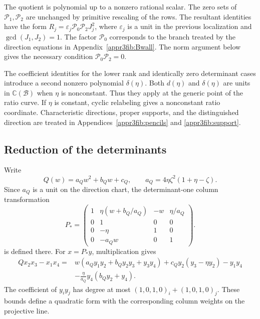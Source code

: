 \documentclass[11pt,a4paper]{article}
\numberwithin{equation}{section}
\theoremstyle{plain}
\theoremstyle{definition}
\theoremstyle{remark}
\begin{document}
The quotient is polynomial up to a nonzero rational scalar. The
zero sets of $\mathcal P_1,\mathcal P_2$ are unchanged by primitive rescaling of the rows.
The resultant identities have the form $R_j=\varepsilon_j\mathcal P_0\mathcal P_2J_j^2$, where
$\varepsilon_j$ is a unit in the previous localization and $\gcd(J_1,J_2)=1$.
The factor $\mathcal P_0$ corresponds to the branch treated by the
direction equations in Appendix~\ref{appr3fib:Bwall}.
The norm argument below gives the necessary condition $\mathcal P_0\mathcal P_2=0$.

The coefficient identities for the lower rank and identically zero
determinant cases introduce a second nonzero polynomial $\delta(\eta)$.
Both $d(\eta)$ and $\delta(\eta)$ are units in
$\mathbb C(\mathscr B)$ when $\eta$ is nonconstant.
Thus they apply at the generic point of the ratio curve.
If $\eta$ is constant, cyclic relabeling gives a nonconstant ratio
coordinate. Characteristic directions, proper supports, and the
distinguished direction are treated in
Appendices~\ref{appr3fib:pencils} and \ref{appr3fib:support}.

\subsection{Reduction of the determinants}
\label{appr3:determinantreduction}

Write
\begin{equation}\label{r3:Qcoefficients}
Q(w)=a_Qw^2+b_Qw+c_Q,\qquad
a_Q=4\eta \zeta ^2(1+\eta -\zeta ).
\end{equation}
Since $a_Q$ is a unit on the direction chart, the determinant-one
column transformation
\begin{equation}\label{r3:columntransform}
P_*=
\begin{pmatrix}
1&\eta (w+b_Q/a_Q)&-w&\eta /a_Q\\
0&1&0&0\\
0&-\eta &1&0\\
0&-a_Qw&0&1
\end{pmatrix}.
\end{equation}
is defined there. For $x=P_*y$, multiplication gives
\begin{equation}\label{r3:transformedmomentquadric}
\begin{aligned}
Qx_2x_3-x_1x_4
={}&w(a_Qy_1y_2+b_Qy_2y_3+y_3y_4)
  +c_Qy_2(y_3-\eta y_2)-y_1y_4\\
 &-\frac{\eta }{a_Q}y_4(b_Qy_2+y_4).
\end{aligned}
\end{equation}
The coefficient of $y_i y_j$ has degree at most
$(1,0,1,0)_i+(1,0,1,0)_j$. These bounds define a quadratic form
with the corresponding column weights on the projective line.
\end{document}
